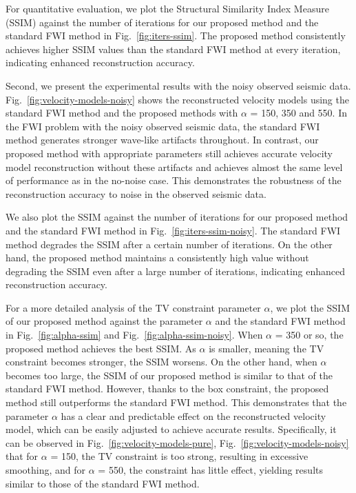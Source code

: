 For quantitative evaluation, we plot the Structural Similarity Index Measure (SSIM) against the number of iterations for our proposed method and the standard FWI method in Fig.~\ref{fig:iters-ssim}.
The proposed method consistently achieves higher SSIM values than the standard FWI method at every iteration, indicating enhanced reconstruction accuracy.

Second, we present the experimental results with the noisy observed seismic data.
Fig.~\ref{fig:velocity-models-noisy} shows the reconstructed velocity models using the standard FWI method and the proposed methods with $\alpha$ = 150, 350 and 550.
In the FWI problem with the noisy observed seismic data, the standard FWI method generates stronger wave-like artifacts throughout.
In contrast, our proposed method with appropriate parameters still achieves accurate velocity model reconstruction without these artifacts and achieves almost the same level of performance as in the no-noise case.
This demonstrates the robustness of the reconstruction accuracy to noise in the observed seismic data.

We also plot the SSIM against the number of iterations for our proposed method and the standard FWI method in Fig.~\ref{fig:iters-ssim-noisy}.
The standard FWI method degrades the SSIM after a certain number of iterations.
On the other hand, the proposed method maintains a consistently high value without degrading the SSIM even after a large number of iterations, indicating enhanced reconstruction accuracy.

For a more detailed analysis of the TV constraint parameter $\alpha$, we plot the SSIM of our proposed method against the parameter $\alpha$ and the standard FWI method in Fig.~\ref{fig:alpha-ssim} and Fig.~\ref{fig:alpha-ssim-noisy}.
When $\alpha$ = 350 or so, the proposed method achieves the best SSIM.
As $\alpha$ is smaller, meaning the TV constraint becomes stronger, the SSIM worsens.
On the other hand, when $\alpha$ becomes too large, the SSIM of our proposed method is similar to that of the standard FWI method.
However, thanks to the box constraint, the proposed method still outperforms the standard FWI method.
This demonstrates that the parameter $\alpha$ has a clear and predictable effect on the reconstructed velocity model, which can be easily adjusted to achieve accurate results.
Specifically, it can be observed in Fig.~\ref{fig:velocity-models-pure}, Fig.~\ref{fig:velocity-models-noisy} that for $\alpha$ = 150, the TV constraint is too strong, resulting in excessive smoothing, and for $\alpha$ = 550, the constraint has little effect, yielding results similar to those of the standard FWI method.

